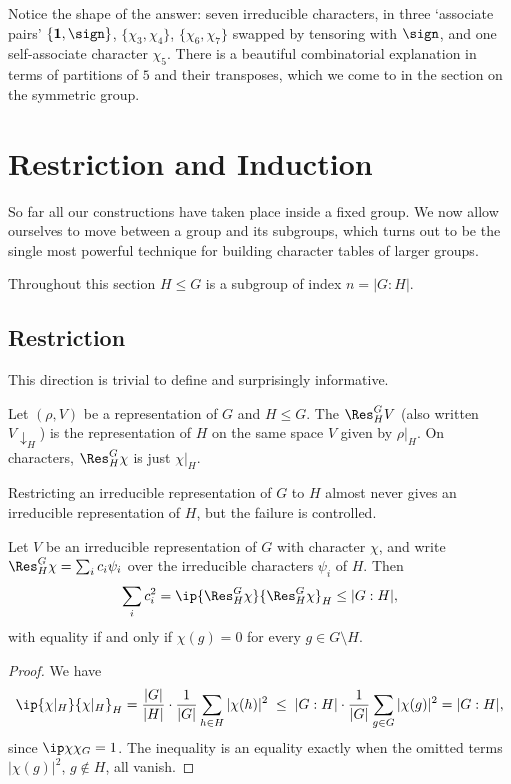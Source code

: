 \begin{remark}
	Notice the shape of the answer: seven irreducible characters, in three `associate pairs' $\{\mathbf1,\sign\}$, $\{\chi_3,\chi_4\}$, $\{\chi_6,\chi_7\}$ swapped by tensoring with $\sign$, and one self-associate character $\chi_5$. There is a beautiful combinatorial explanation in terms of partitions of $5$ and their transposes, which we come to in the section on the symmetric group.
\end{remark}

\section{Restriction and Induction}

So far all our constructions have taken place inside a fixed group. We now allow ourselves to move between a group and its subgroups, which turns out to be the single most powerful technique for building character tables of larger groups.

Throughout this section $H \leq G$ is a subgroup of index $n = |G:H|$.

\subsection{Restriction}

This direction is trivial to define and surprisingly informative.

\begin{definition}[Restriction]
	Let $(\rho, V)$ be a representation of $G$ and $H\leq G$. The  $\Res^G_H V$ (also written $V\!\downarrow_H$) is the representation of $H$ on the same space $V$ given by $\rho|_H$. On characters, $\Res^G_H\chi$ is just $\chi|_H$.
\end{definition}

Restricting an irreducible representation of $G$ to $H$ almost never gives an irreducible representation of $H$, but the failure is controlled.

\begin{proposition}
	Let $V$ be an irreducible representation of $G$ with character $\chi$, and write $\Res^G_H\chi = \sum_i c_i\psi_i$ over the irreducible characters $\psi_i$ of $H$. Then
	$$\sum_i c_i^2 = \ip{\Res^G_H\chi}{\Res^G_H\chi}_H \leq |G:H|,$$
	with equality if and only if $\chi(g) = 0$ for every $g \in G\setminus H$.
\end{proposition}
\begin{proof}
	We have
	$$\ip{\chi|_H}{\chi|_H}_H = \frac{|G|}{|H|}\cdot\frac1{|G|}\sum_{h\in H}|\chi(h)|^2 \; \leq \; |G:H|\cdot\frac1{|G|}\sum_{g\in G}|\chi(g)|^2 = |G:H|,$$
	since $\ip\chi\chi_G = 1$. The inequality is an equality exactly when the omitted terms $|\chi(g)|^2$, $g\notin H$, all vanish.
\end{proof}


